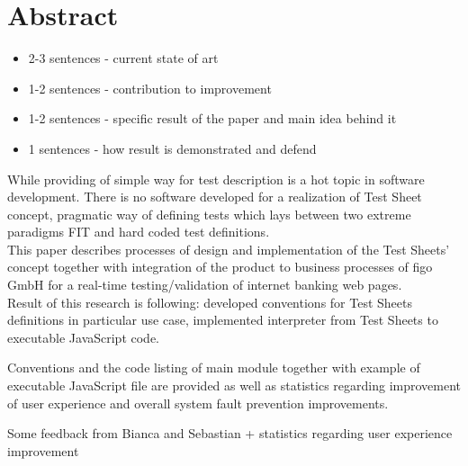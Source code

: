 \chapter{Abstract}
\begin{itemize}
\item 2-3 sentences - current state of art
\item 1-2 sentences - contribution to improvement
\item 1-2 sentences - specific result of the paper and main idea behind it
\item 1 sentences - how result is demonstrated and defend
\end{itemize}


While providing of simple way for test description is a hot topic in software development. There is no software developed for a realization of Test Sheet concept, pragmatic way of defining tests which lays between two extreme paradigms FIT and hard coded test definitions. \\

This paper describes processes of design and implementation of the Test Sheets' concept together with integration of the product to business processes of figo GmbH for a real-time testing/validation of internet banking web pages.\\

Result of this research is following: developed conventions for Test Sheets definitions in particular use case, implemented interpreter from Test Sheets to executable JavaScript  code.

Conventions and the code listing of main module together with example of  executable JavaScript file are provided as well as statistics regarding improvement of user experience and overall system fault prevention improvements.


Some feedback from Bianca and Sebastian + statistics regarding user experience improvement

